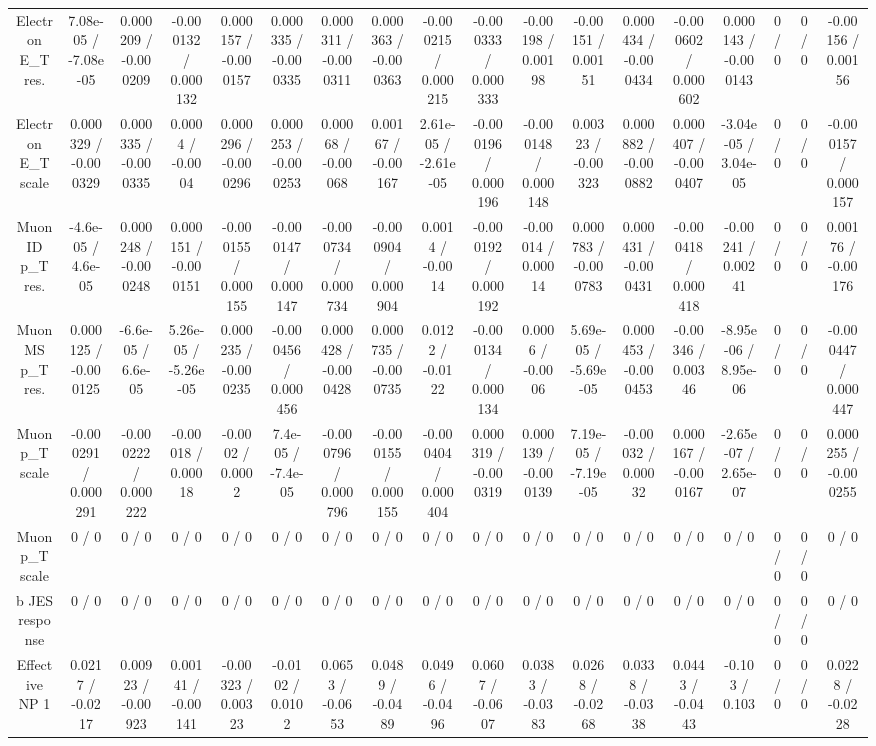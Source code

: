\documentclass[10pt]{article}
\begin{document}
\begin{table}[htbp]
\begin{center}
\begin{tabular}{|c|c|c|c|c|c|c|c|c|c|c|c|c|c|c|c|c|c|}
  Electron E_{T} res. & 7.08e-05 / -7.08e-05 & 0.000209 / -0.000209 & -0.000132 / 0.000132 & 0.000157 / -0.000157 & 0.000335 / -0.000335 & 0.000311 / -0.000311 & 0.000363 / -0.000363 & -0.000215 / 0.000215 & -0.000333 / 0.000333 & -0.00198 / 0.00198 & -0.00151 / 0.00151 & 0.000434 / -0.000434 & -0.000602 / 0.000602 & 0.000143 / -0.000143 & 0 / 0 & 0 / 0 & -0.00156 / 0.00156 \\ 
  Electron E_{T} scale & 0.000329 / -0.000329 & 0.000335 / -0.000335 & 0.0004 / -0.0004 & 0.000296 / -0.000296 & 0.000253 / -0.000253 & 0.00068 / -0.00068 & 0.00167 / -0.00167 & 2.61e-05 / -2.61e-05 & -0.000196 / 0.000196 & -0.000148 / 0.000148 & 0.00323 / -0.00323 & 0.000882 / -0.000882 & 0.000407 / -0.000407 & -3.04e-05 / 3.04e-05 & 0 / 0 & 0 / 0 & -0.000157 / 0.000157 \\ 
  Muon ID p_{T} res. & -4.6e-05 / 4.6e-05 & 0.000248 / -0.000248 & 0.000151 / -0.000151 & -0.000155 / 0.000155 & -0.000147 / 0.000147 & -0.000734 / 0.000734 & -0.000904 / 0.000904 & 0.0014 / -0.0014 & -0.000192 / 0.000192 & -0.00014 / 0.00014 & 0.000783 / -0.000783 & 0.000431 / -0.000431 & -0.000418 / 0.000418 & -0.00241 / 0.00241 & 0 / 0 & 0 / 0 & 0.00176 / -0.00176 \\ 
  Muon MS p_{T} res. & 0.000125 / -0.000125 & -6.6e-05 / 6.6e-05 & 5.26e-05 / -5.26e-05 & 0.000235 / -0.000235 & -0.000456 / 0.000456 & 0.000428 / -0.000428 & 0.000735 / -0.000735 & 0.0122 / -0.0122 & -0.000134 / 0.000134 & 0.0006 / -0.0006 & 5.69e-05 / -5.69e-05 & 0.000453 / -0.000453 & -0.00346 / 0.00346 & -8.95e-06 / 8.95e-06 & 0 / 0 & 0 / 0 & -0.000447 / 0.000447 \\ 
  Muon p_{T} scale & -0.000291 / 0.000291 & -0.000222 / 0.000222 & -0.00018 / 0.00018 & -0.0002 / 0.0002 & 7.4e-05 / -7.4e-05 & -0.000796 / 0.000796 & -0.000155 / 0.000155 & -0.000404 / 0.000404 & 0.000319 / -0.000319 & 0.000139 / -0.000139 & 7.19e-05 / -7.19e-05 & -0.00032 / 0.00032 & 0.000167 / -0.000167 & -2.65e-07 / 2.65e-07 & 0 / 0 & 0 / 0 & 0.000255 / -0.000255 \\ 
  Muon p_{T} scale & 0 / 0 & 0 / 0 & 0 / 0 & 0 / 0 & 0 / 0 & 0 / 0 & 0 / 0 & 0 / 0 & 0 / 0 & 0 / 0 & 0 / 0 & 0 / 0 & 0 / 0 & 0 / 0 & 0 / 0 & 0 / 0 & 0 / 0 \\ 
  b JES response & 0 / 0 & 0 / 0 & 0 / 0 & 0 / 0 & 0 / 0 & 0 / 0 & 0 / 0 & 0 / 0 & 0 / 0 & 0 / 0 & 0 / 0 & 0 / 0 & 0 / 0 & 0 / 0 & 0 / 0 & 0 / 0 & 0 / 0 \\ 
  Effective NP 1 & 0.0217 / -0.0217 & 0.00923 / -0.00923 & 0.00141 / -0.00141 & -0.00323 / 0.00323 & -0.0102 / 0.0102 & 0.0653 / -0.0653 & 0.0489 / -0.0489 & 0.0496 / -0.0496 & 0.0607 / -0.0607 & 0.0383 / -0.0383 & 0.0268 / -0.0268 & 0.0338 / -0.0338 & 0.0443 / -0.0443 & -0.103 / 0.103 & 0 / 0 & 0 / 0 & 0.0228 / -0.0228 \\ 

\end{tabular}
\end{center}
\end{table}
\end{document}
